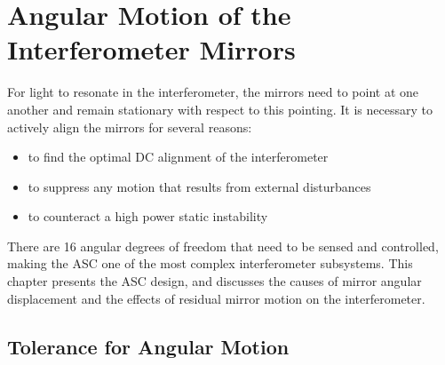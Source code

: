 \chapter{Angular Motion of the Interferometer Mirrors}

For light to resonate in the interferometer, the mirrors need to point at one another and remain stationary with respect to this pointing. It is necessary to actively align the mirrors for several reasons:
\begin{itemize}
\item to find the optimal DC alignment of the interferometer \vspace{-10 pt}
\item to suppress any motion that results from external disturbances \vspace{-10 pt}
\item to counteract a high power static instability
\end{itemize}
There are 16 angular degrees of freedom that need to be sensed and controlled, making the ASC one of the most complex interferometer subsystems. This chapter presents the ASC design, and discusses the causes of mirror angular displacement and the effects of residual mirror motion on the interferometer.















\section{Tolerance for Angular Motion}
\label{sec:tolerance}


